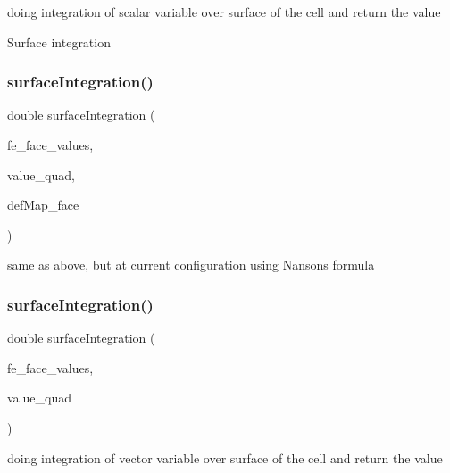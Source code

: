 doing integration of scalar variable over surface of the cell and return the value

Surface integration \mbox{\label{class_residual_ad44c10c32c915ba9b431c0256a2769c2}} 
\subsubsection{\texorpdfstring{surfaceIntegration()}{surfaceIntegration()}\hspace{0.1cm}{\footnotesize\ttfamily [2/6]}}
{\footnotesize\ttfamily double surface\+Integration (\begin{DoxyParamCaption}\item[{const F\+E\+Face\+Values$<$ dim $>$ \&}]{fe\+\_\+face\+\_\+values,  }\item[{double}]{value\+\_\+quad,  }\item[{\mbox{\hyperlink{structdeformation_map}{deformation\+Map}}$<$ T, dim $>$ \&}]{def\+Map\+\_\+face }\end{DoxyParamCaption})}

same as above, but at current configuration using Nanson\textquotesingle{}s formula \mbox{\label{class_residual_a6753ecdc0e19b7bac24615d47889ae65}} 
\subsubsection{\texorpdfstring{surfaceIntegration()}{surfaceIntegration()}\hspace{0.1cm}{\footnotesize\ttfamily [3/6]}}
{\footnotesize\ttfamily double surface\+Integration (\begin{DoxyParamCaption}\item[{const F\+E\+Face\+Values$<$ dim $>$ \&}]{fe\+\_\+face\+\_\+values,  }\item[{dealii\+::\+Table$<$ 1, Sacado\+::\+Fad\+::\+D\+Fad$<$ double $>$ $>$ \&}]{value\+\_\+quad }\end{DoxyParamCaption})}

doing integration of vector variable over surface of the cell and return the value \mbox{\label{class_residual_a71923ccf434fa6503c37afd0ca7d0100}} 
